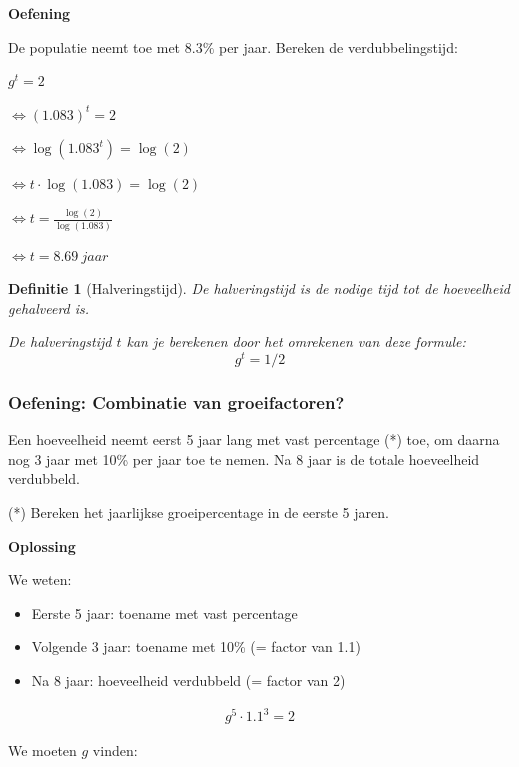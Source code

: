 \documentclass{article}
\newtheorem{theorem}{Definitie}[section]
\begin{document}
\textbf{Oefening}

De populatie neemt toe met $8.3\%$ per jaar. Bereken de verdubbelingstijd:

\begin{center}
$g^t = 2$

$\Leftrightarrow (1.083)^t = 2$

$\Leftrightarrow \log(1.083^t) = \log(2)$

$\Leftrightarrow t \cdot \log(1.083) = \log(2)$

$\Leftrightarrow t = \frac{\log(2)}{\log(1.083)}$

$\Leftrightarrow t = 8.69\ jaar$

\end{center}


\begin{theorem}[Halveringstijd]
De halveringstijd is de nodige tijd tot de hoeveelheid gehalveerd is.

De halveringstijd $t$ kan je berekenen door het omrekenen van deze formule:
\begin{equation}
g^t = 1/2
\end{equation}
\end{theorem}

\subsubsection{Oefening: Combinatie van groeifactoren?}

Een hoeveelheid neemt eerst 5 jaar lang met vast percentage (*) toe, 
om daarna nog 3 jaar met 10\% per jaar toe te nemen. Na 8 jaar is
de totale hoeveelheid verdubbeld.

(*) Bereken het jaarlijkse groeipercentage in de eerste 5 jaren.

\textbf{Oplossing}

We weten:

\begin{itemize}
    \item Eerste 5 jaar: toename met vast percentage
    \item Volgende 3 jaar: toename met 10\% (= factor van 1.1)
    \item Na 8 jaar: hoeveelheid verdubbeld (= factor van 2)
\end{itemize}

\begin{align*}
g^5 \cdot 1.1^3 = 2
\end{align*}

We moeten $g$ vinden:
\end{document}

